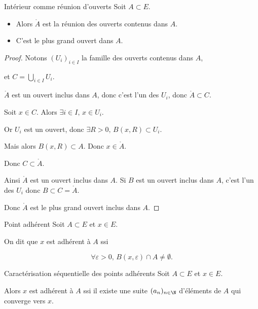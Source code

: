 \begin{theoreme}{Intérieur comme réunion d'ouverts}{}
    Soit $A \subset E$.

    \begin{itemize}
        \item Alors $\mathring{A}$ est la réunion des ouverts contenus dans $A$.
        \item C'est le plus grand ouvert dans $A$.
    \end{itemize}
\end{theoreme}

\begin{proof}
    Notons $(U_i)_{i \in I}$ la famille des ouverts contenus dans $A$, 
    
    et $C = \bigcup_{i \in I} U_i$.

    $\mathring A$ est un ouvert inclus dans $A$, donc c'est l'un des $U_i$, donc $\mathring A \subset C$.

    Soit $x \in C$. Alors $\exists i \in I, \, x \in U_i$.

    Or $U_i$ est un ouvert, donc $\exists R > 0, \, B(x, R) \subset U_i$. 

    Mais alors $B(x, R) \subset A$. Donc $x \in \mathring A$.

    Donc $C \subset \mathring A$.

    Ainsi $\mathring A$ est un ouvert inclus dans $A$. Si $B$ est un ouvert inclus dans 
    $A$, c'est l'un des $U_i$ donc $B \subset C = \mathring A$.

    Donc $\mathring A$ est le plus grand ouvert inclus dans $A$.
\end{proof}

\begin{definition}{Point adhérent}{}
    Soit $A \subset E$ et $x \in E$.

    On dit que $x$ est adhérent à $A$ ssi 

    $$ \forall \varepsilon > 0, \, B(x, \varepsilon) \cap A \neq \emptyset.$$
\end{definition}

\begin{theoreme}{Caractérisation séquentielle des points adhérents}{}
    Soit $A \subset E$ et $x \in E$.

    Alors $x$ est adhérent à $A$ ssi il existe une suite $(a_n)_{n \in \N}$ d'éléments de $A$ 
    qui converge vers $x$.
\end{theoreme}

